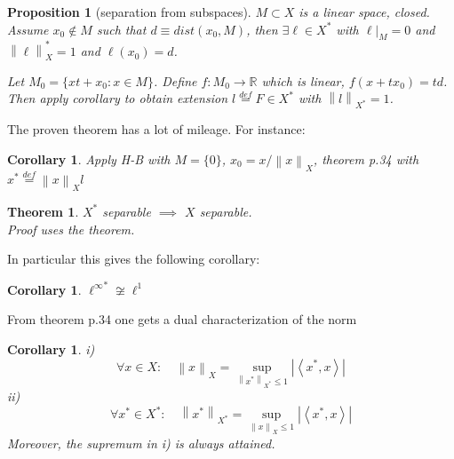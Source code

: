 \documentclass{article}
\newcommand{\nextline}{\hfill\break}
\newcommand{\inne}[2]{\left<{#1},{#2}\right>}
\newcommand{\norm}[1]{\left\|{#1}\right\|}
\newcommand{\dual}[1]{{#1}^*}
\newcommand{\func}[3]{\({#1}:{#2}\xrightarrow{}{#3}\)}
\newcommand{\real}{\mathbb{R}}
\newtheorem{proposition}[example]{Proposition}
\newtheorem{theorem}[example]{Theorem}
\newtheorem{corollary}[example]{Corollary}
\begin{document}
\begin{proposition}[separation from subspaces]\rm\nextline
    \(M\subset X\) is a linear space, closed. Assume \(x_0\not\in M\) such that \(d\equiv dist(x_0,M)\), then \(\exists \ell\in\dual{X}\) with \(\ell|_M=0\) and \(\norm{\ell}_\dual{X}=1\) and \(\ell(x_0)=d\).
    \begin{pf}{}{}
        Let \(M_0=\{xt+x_0:x\in M\}\). Define \func{f}{M_0}{\real} which is linear, \(f(x+tx_0)=td\). Then apply corollary to obtain extension \(l\stackrel{def}{=}F\in \dual X\) with \(\norm{l}_{\dual X}=1\).
    \end{pf}
    \end{proposition}

    The proven theorem has a lot of mileage. For instance:
    \begin{corollary}\rm\nextline
        Apply H-B with \(M=\{0\}\), \(x_0=x/{\norm{x}_X}\), theorem p.34 with \(\dual x\stackrel{def}{=}\norm{x}_Xl\)
    \end{corollary}

        \begin{theorem}\rm\nextline
            \(\dual X\) separable \(\implies\) \(X\) separable.
            \\
            Proof uses the theorem.
        \end{theorem}
In particular this gives the following corollary:
\begin{corollary}\rm\nextline
    \(\dual{\ell^\infty}\not\cong \ell^1\)
\end{corollary}
From theorem p.34 one gets a dual characterization of the norm
\begin{corollary}\rm\nextline
    i) 
    $$
    \forall x\in X:\quad\norm{x}_X=\sup_{\norm{\dual x}_{\dual X}\leq1}|\inne{\dual x}{x}|
    $$
     ii) 
     $$
     \forall {\dual x}\in {\dual X}:\quad\norm{{\dual x}}_{\dual X}=\sup_{\norm{x}_{X}\leq1}|\inne{\dual x}{x}|$$
Moreover, the supremum in i) is always attained.
\begin{pf}{}{}
    
\end{pf}

\end{corollary}
\end{document}
